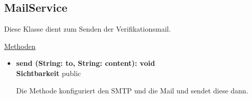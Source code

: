 \newpage
\subsection{MailService}\label{MailService}
Diese Klasse dient zum Senden der Verifikationsmail.


\underline{Methoden}
\begin{itemize}
\itemsep0pt
\item \textbf{send (String: to, String: content): void}\hfill\\
\textbf{Sichtbarkeit} public

Die Methode konfiguriert den SMTP und die Mail und sendet diese dann.

\end{itemize}
